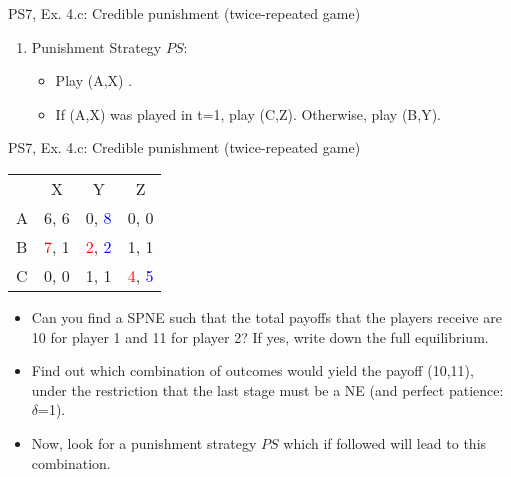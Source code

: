 \begin{frame}{PS7, Ex. 4.c: Credible punishment (twice-repeated game)}
\begin{multicols}{2}
\begin{enumerate}
\begin{itemize}
        \end{itemize}
        \item[b] Punishment Strategy $PS$:
        \begin{itemize}\normalsize
          \item[t=1:] Play (A,X) .
          \item[t=2:] If (A,X) was played in t=1, play (C,Z). Otherwise, play (B,Y).
        \end{itemize}
      \end{enumerate}
      \vspace{-14pt}
      \vspace{-22pt}
      \vfill\null
    \end{multicols}
\end{frame}

\begin{frame}{PS7, Ex. 4.c: Credible punishment (twice-repeated game)}
    \vspace{-2pt}
    \begin{table}
      \begin{tabular}{l|c|c|c|}
        \multicolumn{1}{c}{} & \multicolumn{1}{c}{X} & \multicolumn{1}{c}{Y} & \multicolumn{1}{c}{Z}\\\cline{2-4}
        A   & 6, 6 &  0, \textcolor{blue}{8} &  0, 0  \\\cline{2-4}
        B & \textcolor{red}{7}, 1  & \textcolor{red}{2}, \textcolor{blue}{2} &  1, 1  \\\cline{2-4}
        C & 0, 0  & 1, 1 &  \textcolor{red}{4}, \textcolor{blue}{5}  \\\cline{2-4}
      \end{tabular}
    \end{table}
    \vspace{-4pt}
    \begin{itemize}
        \item[(c)] Can you find a SPNE such that the total payoffs that the players receive are 10 for player 1 and 11 for player 2? If yes, write down the full equilibrium.
    \end{itemize}
    \vspace{-8pt}
    \begin{multicols}{2}
      \begin{itemize}
        \item[(Step a)] Find out which combination of outcomes would yield the payoff (10,11), under the restriction that the last stage must be a NE (and perfect patience: $\delta$=1).
        \item[(Step b)] Now, look for a punishment strategy $PS$ which if followed will lead to this combination.

\end{itemize}
\end{multicols}
\end{frame}
